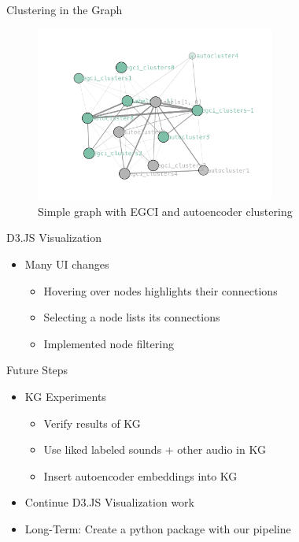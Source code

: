 \begin{frame}{Clustering in the Graph}
    \begin{figure}
        \centering
        \includegraphics[height=0.7\textheight,width=0.7\textwidth,keepaspectratio]{images/graph_clustering.png}
        \caption{Simple graph with EGCI and autoencoder clustering}
    \end{figure}
\end{frame}

\begin{frame}{D3.JS Visualization}
    \begin{itemize}
        \item Many UI changes
        \begin{itemize}
            \item Hovering over nodes highlights their connections
            \item Selecting a node lists its connections
            \item Implemented node filtering
        \end{itemize}
    \end{itemize}
\end{frame}

\begin{frame}{Future Steps}
    \begin{itemize}
        \item KG Experiments
        \begin{itemize}
            \item Verify results of KG
            \item Use liked labeled sounds + other audio in KG
            \item Insert autoencoder embeddings into KG
        \end{itemize}
        \item Continue D3.JS Visualization work
        \item Long-Term: Create a python package with our pipeline
    \end{itemize}
\end{frame}

